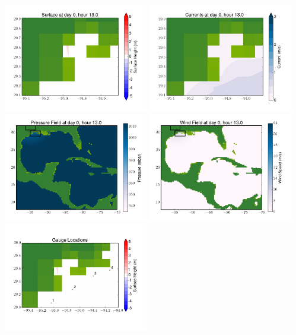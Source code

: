 \documentclass[11pt]{article}
\begin{document}
\includegraphics[width=0.475\textwidth]{frame0085fig6.png}
\vskip 10pt 
\includegraphics[width=0.475\textwidth]{frame0085fig7.png}
\includegraphics[width=0.475\textwidth]{frame0085fig8.png}
\vskip 10pt 
\includegraphics[width=0.475\textwidth]{frame0085fig9.png}
\includegraphics[width=0.475\textwidth]{frame0085fig10.png}
\end{document}
